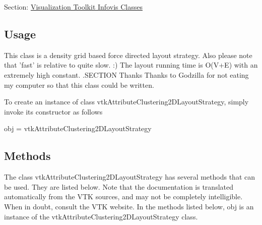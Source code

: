Section\-: \hyperlink{sec_vtkinfovis}{Visualization Toolkit Infovis Classes} \hypertarget{vtkwidgets_vtkxyplotwidget_Usage}{}\subsection{Usage}\label{vtkwidgets_vtkxyplotwidget_Usage}
This class is a density grid based force directed layout strategy. Also please note that 'fast' is relative to quite slow. \-:) The layout running time is O(V+\-E) with an extremely high constant. .S\-E\-C\-T\-I\-O\-N Thanks Thanks to Godzilla for not eating my computer so that this class could be written.

To create an instance of class vtk\-Attribute\-Clustering2\-D\-Layout\-Strategy, simply invoke its constructor as follows \begin{DoxyVerb}  obj = vtkAttributeClustering2DLayoutStrategy
\end{DoxyVerb}
 \hypertarget{vtkwidgets_vtkxyplotwidget_Methods}{}\subsection{Methods}\label{vtkwidgets_vtkxyplotwidget_Methods}
The class vtk\-Attribute\-Clustering2\-D\-Layout\-Strategy has several methods that can be used. They are listed below. Note that the documentation is translated automatically from the V\-T\-K sources, and may not be completely intelligible. When in doubt, consult the V\-T\-K website. In the methods listed below, {\ttfamily obj} is an instance of the vtk\-Attribute\-Clustering2\-D\-Layout\-Strategy class. 
